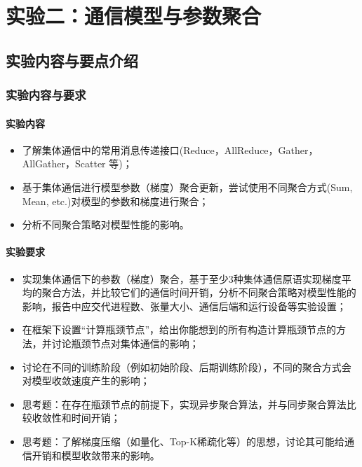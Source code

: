 \chapter{实验二：通信模型与参数聚合}

\section{实验内容与要点介绍}

\subsection{实验内容与要求}

\subsubsection{实验内容}
\begin{itemize}
    \item 了解集体通信中的常用消息传递接口(Reduce，AllReduce，Gather，AllGather，Scatter 等)；
    \item 基于集体通信进行模型参数（梯度）聚合更新，尝试使用不同聚合方式(Sum, Mean, etc.)对模型的参数和梯度进行聚合；
    \item 分析不同聚合策略对模型性能的影响。
\end{itemize}

\subsubsection{实验要求}
\begin{itemize}
    \item 实现集体通信下的参数（梯度）聚合，基于至少3种集体通信原语实现梯度平均的聚合方法，并比较它们的通信时间开销，分析不同聚合策略对模型性能的影响，报告中应交代进程数、张量大小、通信后端和运行设备等实验设置；
    \item 在框架下设置``计算瓶颈节点''，给出你能想到的所有构造计算瓶颈节点的方法，并讨论瓶颈节点对集体通信的影响；
    \item 讨论在不同的训练阶段（例如初始阶段、后期训练阶段），不同的聚合方式会对模型收敛速度产生的影响；
    \item 思考题：在存在瓶颈节点的前提下，实现异步聚合算法，并与同步聚合算法比较收敛性和时间开销；
    \item 思考题：了解梯度压缩（如量化、Top-K稀疏化等）的思想，讨论其可能给通信开销和模型收敛带来的影响。
\end{itemize}

